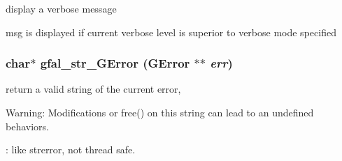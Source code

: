 display a verbose message 

msg is displayed if current verbose level is superior to verbose mode specified 
\subsubsection{\setlength{\rightskip}{0pt plus 5cm}char$\ast$ gfal\_\-str\_\-GError (GError $\ast$$\ast$ {\em err})}\label{gfal__common__errverbose_8c_c35c45ff43533cc6e7c176b0fa0b3128}


return a valid string of the current error, \begin{Desc}
\item[Warning:]Modifications or free() on this string can lead to an undefined behaviors. 

: like strerror, not thread safe. \end{Desc}
